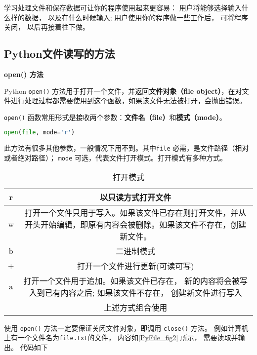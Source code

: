 

学习处理文件和保存数据可让你的程序使用起来更容易： 用户将能够选择输入什么样的数据， 以及在什么时候输入; 用户使用你的程序做一些工作后， 可将程序关闭， 以后再接着往下做。

\subsection{Python文件读写的方法}
\textbf{open() 方法}

Python \verb|open()| 方法用于打开一个文件，并返回\textbf{文件对象（file object）}，在对文件进行处理过程都需要使用到这个函数，如果该文件无法被打开，会抛出错误。

\verb|open()| 函数常用形式是接收两个参数：\textbf{文件名（file）}和\textbf{模式（mode）}。
\begin{lstlisting}[language=python]
open(file, mode='r')
\end{lstlisting}
此方法有很多其他参数，一般情况下用不到。其中\verb|file| 必需，是文件路径（相对或者绝对路径）； \verb|mode| 可选，代表文件打开模式。打开模式有多种方式。
\begin{table}[ht]
\centering
\caption{打开模式}\label{PyFile_tab1}
\begin{tabular}{|c|c|}
\hline
r & 以只读方式打开文件 \\
\hline
w & 打开一个文件只用于写入。如果该文件已存在则打开文件，并从开头开始编辑，即原有内容会被删除。如果该文件不存在，创建新文件。 \\
\hline
b & 二进制模式 \\
\hline
+ & 打开一个文件进行更新(可读可写) \\
\hline
a & 打开一个文件用于追加。如果该文件已存在， 新的内容将会被写入到已有内容之后; 如果该文件不存在， 创建新文件进行写入 \\
\hline
&上述方式组合使用   \\
\hline
\end{tabular}
\end{table}

使用 \verb|open()| 方法一定要保证关闭文件对象，即调用 \verb|close()| 方法。 例如计算机上有一个文件名为\verb|file.txt|的文件， 内容如\autoref{PyFile_fig2} 所示， 需要读取并输出。 代码如下

